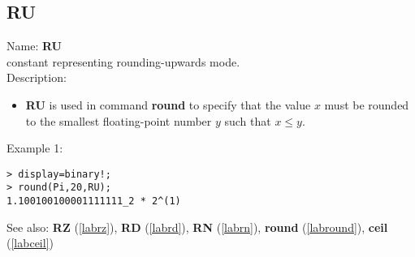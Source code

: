 \subsection{RU}
\label{labru}
\noindent Name: \textbf{RU}\\
constant representing rounding-upwards mode.\\
\noindent Description: \begin{itemize}

\item \textbf{RU} is used in command \textbf{round} to specify that the value $x$ must be rounded
   to the smallest floating-point number $y$ such that $x \le y$.
\end{itemize}
\noindent Example 1: 
\begin{center}\begin{minipage}{15cm}\begin{Verbatim}[frame=single]
> display=binary!;
> round(Pi,20,RU);
1.100100100001111111_2 * 2^(1)
\end{Verbatim}
\end{minipage}\end{center}
See also: \textbf{RZ} (\ref{labrz}), \textbf{RD} (\ref{labrd}), \textbf{RN} (\ref{labrn}), \textbf{round} (\ref{labround}), \textbf{ceil} (\ref{labceil})
